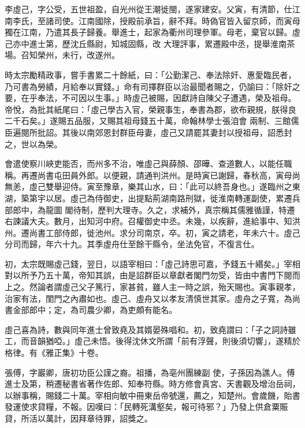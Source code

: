 \begin{pinyinscope}
 李虛己，字公受，五世祖盈，自光州從王潮徙閩，遂家建安。父寅，有清節，仕江南李氏，至諸司使。江南國除，授殿前承旨，辭不拜。時偽官皆入留京師，而寅母獨在江南，乃遣其長子歸養。舉進士，起家為衢州司理參軍。母老，棄官以歸。虛己亦中進士第，歷沈丘縣尉，知城固縣，改
 大理評事，累遷殿中丞，提舉淮南茶場。召知榮州，未行，改遂州。



 時太宗勵精政事，嘗手書累二十餘紙，曰：「公勤潔己、奉法除奸、惠愛臨民者，乃可書為勞績，月給奉以實錢。」命有司擇群臣以治最聞者賜之，仍諭曰：「除奸之要，在乎奉法，不可因以生事。」時虛己被賜，因獻詩自陳父子遭遇，榮及祖母。帝悅，為批其紙尾曰：「虛己學古入官，榮親事生，奉書為郡，欲布親規，朕得良二千石矣。」遂賜五品服，又賜其祖母錢五十萬，命翰林學士張洎會
 兩制、三館儒臣遍閱所批詔。其後以南郊恩封群臣母妻，虛己又請罷其妻封以授祖母，詔悉封之，世以為榮。



 會遣使察川峽吏能否，而州多不治，唯虛己與薛顏、邵曄、查道數人，以能任職稱。再遷尚書屯田員外郎。以便親，請通判洪州。是時寅已謝歸，春秋高，寅母尚無恙，虛己雙舉迎侍。寅至豫章，樂其山水，曰：「此可以終吾身也。」遂臨州之東湖，築第宇以居。虛己為侍御史，出提點荊湖南路刑獄，徙淮南轉運副使，累遷兵部郎中，為龍圖
 閣待制，歷判大理寺。久之，求補外，真宗稱其儒雅循謹，特遷右諫議大夫。數月，出知河中府。召權御史中丞。未幾，以疾辭，進給事中、知洪州。遷尚書工部侍郎，徙池州。求分司南京，卒。初，寅之請老，年未六十。虛己分司而歸，年六十九。其季虛舟仕至餘干縣令，坐法免官，不復言仕。



 初，太宗既賜虛己錢，翌日，以語宰相曰：「虛己詩思可嘉，予錢五十緡矣。」宰相對以所予乃五十萬，帝知其誤，由是詔群臣以章獻者閣門勿受，皆由中書門下閱而
 上之。然論者謂虛己父子篤行，家甚貧，雖人主一時之誤，殆天賜也。寅事親孝，治家有法，閨門之內肅如也。虛己、虛舟又以孝友清慎世其家。虛舟之子寬，為尚書金部郎中；定，為司農少卿，為吏頗有能名。



 虛己喜為詩，數與同年進士曾致堯及其婿晏殊唱和。初，致堯謂曰：「子之詞詩雖工，而音韻猶啞。」虛己未悟。後得沈休文所謂「前有浮聲，則後須切響」，遂精於格律。有《雅正集》十卷。



 張傅，字巖卿，唐初功臣公謹之裔。祖播，為亳州團練副
 使，子孫因為譙人。傅進士及第，稍遷秘書省著作佐郎、知奉符縣。時方修會真宮、天書觀及增治岳祠，以辦事稱，賜錢二十萬。宰相向敏中冊東岳帝號還，薦之，知楚州。會歲饑，貽書發運使求貸糧，不報。因嘆曰：「民轉死溝壑矣，報可待邪？」乃發上供倉粟賑貸，所活以萬計，因拜章待罪，詔獎之。




\end{pinyinscope}
